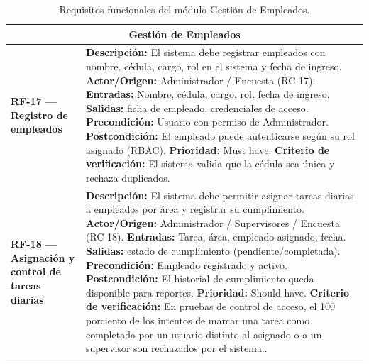 \documentclass[11pt,a4paper]{article}
\begin{document}
\newpage
\begin{longtable}{|p{3.5cm}|p{12cm}|}
\caption{Requisitos funcionales del módulo Gestión de Empleados.}
\label{tab:rf-empleados} \\
\hline

\multicolumn{2}{|c|}{\textbf{Gestión de Empleados}} \\ \hline

\textbf{RF-17 — Registro de empleados} &
\textbf{Descripción:} El sistema debe registrar empleados con nombre, cédula, cargo, rol en el sistema y fecha de ingreso. \newline
\textbf{Actor/Origen:} Administrador / Encuesta (RC-17). \newline
\textbf{Entradas:} Nombre, cédula, cargo, rol, fecha de ingreso. \newline
\textbf{Salidas:} ficha de empleado, credenciales de acceso. \newline
\textbf{Precondición:} Usuario con permiso de Administrador. \newline
\textbf{Postcondición:} El empleado puede autenticarse según su rol asignado (RBAC). \newline
\textbf{Prioridad:} Must have. \newline
\textbf{Criterio de verificación:} El sistema valida que la cédula sea única y rechaza duplicados. \\ \hline

\textbf{RF-18 — Asignación y control de tareas diarias} &
\textbf{Descripción:} El sistema debe permitir asignar tareas diarias a empleados por área y registrar su cumplimiento. \newline
\textbf{Actor/Origen:} Administrador / Supervisores / Encuesta (RC-18). \newline
\textbf{Entradas:} Tarea, área, empleado asignado, fecha. \newline
\textbf{Salidas:} estado de cumplimiento (pendiente/completada). \newline
\textbf{Precondición:} Empleado registrado y activo. \newline
\textbf{Postcondición:} El historial de cumplimiento queda disponible para reportes. \newline
\textbf{Prioridad:} Should have. \newline
\textbf{Criterio de verificación:} En pruebas de control de acceso, el 100 porciento de los intentos de marcar una tarea como completada por un usuario distinto al asignado o a un supervisor son rechazados por el sistema.. \\ \hline

\end{longtable}
\end{document}
